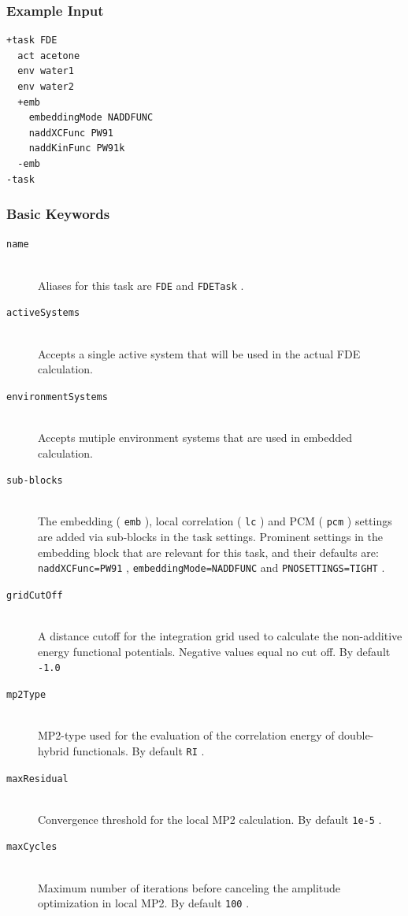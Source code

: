 \documentclass[bibliography=totocnumbered,a4paper,10pt,oneside]{scrbook}
\newcommand{\ttt}[1]{%
  \begingroup\setlength{\fboxsep}{1pt}%
  \colorbox{serenity-green!30}{\texttt{\hspace*{2pt}\vphantom{(g}#1\hspace*{2pt}}}%
  \endgroup
}
\begin{document}
\subsubsection{Example Input}
\begin{lstlisting}
+task FDE
  act acetone
  env water1
  env water2
  +emb
    embeddingMode NADDFUNC
    naddXCFunc PW91
    naddKinFunc PW91k
  -emb
-task
\end{lstlisting}
\subsubsection{Basic Keywords}
\begin{description}
	 \item [\texttt{name}]\hfill \\
	Aliases for this task are \ttt{FDE} and \ttt{FDETask}.
	\item [\texttt{activeSystems}]\hfill \\
	Accepts a single active system that will be used in the actual FDE calculation.
	\item [\texttt{environmentSystems}]\hfill \\
	Accepts mutiple environment systems that are used in embedded calculation.
	\item [\texttt{sub-blocks}]\hfill \\
	The embedding (\ttt{emb}), local correlation (\ttt{lc}) and PCM (\ttt{pcm}) settings are added via sub-blocks in the task settings.
	Prominent settings in the embedding block that are relevant for this task, and their defaults are:
	\ttt{naddXCFunc=PW91}, \ttt{embeddingMode=NADDFUNC} and \ttt{PNOSETTINGS=TIGHT}.
	\item [\texttt{gridCutOff}] \hfill \\
    A distance cutoff for the integration grid used to calculate the non-additive  energy functional potentials. Negative values equal no cut off. By default \ttt{-1.0}
	\item [\texttt{mp2Type}] \hfill \\
	MP2-type used for the evaluation of the correlation energy of double-hybrid functionals. By default \ttt{RI}.
	\item [\texttt{maxResidual}] \hfill \\
	Convergence threshold for the local MP2 calculation. By default \ttt{1e-5}.
	\item [\texttt{maxCycles}] \hfill \\
	Maximum number of iterations before canceling the amplitude optimization in local MP2. By default \ttt{100}.

\end{description}
\end{document}
